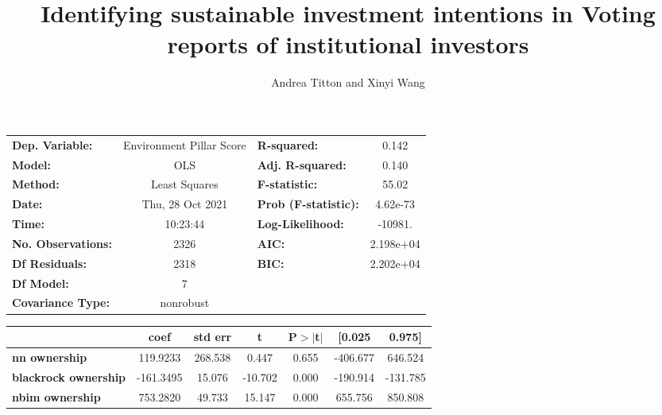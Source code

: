 \documentclass[a4paper]{article}
\title{Identifying sustainable investment intentions in Voting reports of institutional investors}
\author{Andrea Titton and Xinyi Wang}
\begin{document}
\maketitle

\begin{center}
    \begin{tabular}{lclc}
    \toprule
    \textbf{Dep. Variable:}               & Environment Pillar Score & \textbf{  R-squared:         } &     0.142   \\
    \textbf{Model:}                       &           OLS            & \textbf{  Adj. R-squared:    } &     0.140   \\
    \textbf{Method:}                      &      Least Squares       & \textbf{  F-statistic:       } &     55.02   \\
    \textbf{Date:}                        &     Thu, 28 Oct 2021     & \textbf{  Prob (F-statistic):} &  4.62e-73   \\
    \textbf{Time:}                        &         10:23:44         & \textbf{  Log-Likelihood:    } &   -10981.   \\
    \textbf{No. Observations:}            &            2326          & \textbf{  AIC:               } & 2.198e+04   \\
    \textbf{Df Residuals:}                &            2318          & \textbf{  BIC:               } & 2.202e+04   \\
    \textbf{Df Model:}                    &               7          & \textbf{                     } &             \\
    \textbf{Covariance Type:}             &        nonrobust         & \textbf{                     } &             \\
    \bottomrule
    \end{tabular}
    \begin{tabular}{lcccccc}
                                          & \textbf{coef} & \textbf{std err} & \textbf{t} & \textbf{P$> |$t$|$} & \textbf{[0.025} & \textbf{0.975]}  \\
    \midrule
    \textbf{nn ownership}                 &     119.9233  &      268.538     &     0.447  &         0.655        &     -406.677    &      646.524     \\
    \textbf{blackrock ownership}          &    -161.3495  &       15.076     &   -10.702  &         0.000        &     -190.914    &     -131.785     \\
    \textbf{nbim ownership}               &     753.2820  &       49.733     &    15.147  &         0.000        &      655.756    &      850.808     \\

\end{tabular}
\end{center}
\end{document}
